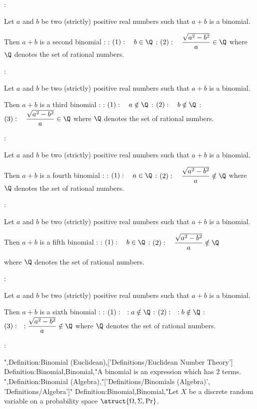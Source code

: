 :

Let $a$ and $b$ be two (strictly) positive real numbers such that $a + b$ is a binomial.


Then $a + b$ is a second binomial :
: $(1): \quad b \in \Q$
: $(2): \quad \dfrac {\sqrt {a^2 - b^2}} a \in \Q$
where $\Q$ denotes the set of rational numbers.



:

Let $a$ and $b$ be two (strictly) positive real numbers such that $a + b$ is a binomial.


Then $a + b$ is a third binomial :
: $(1): \quad a \notin \Q$
: $(2): \quad b \notin \Q$
: $(3): \quad \dfrac {\sqrt {a^2 - b^2}} a \in \Q$
where $\Q$ denotes the set of rational numbers.



:

Let $a$ and $b$ be two (strictly) positive real numbers such that $a + b$ is a binomial.


Then $a + b$ is a fourth binomial :
: $(1): \quad a \in \Q$
: $(2): \quad \dfrac {\sqrt {a^2 - b^2}} a \notin \Q$
where $\Q$ denotes the set of rational numbers.



:

Let $a$ and $b$ be two (strictly) positive real numbers such that $a + b$ is a binomial.


Then $a + b$ is a fifth binomial :
: $(1): \quad b \in \Q$
: $(2): \quad \dfrac {\sqrt {a^2 - b^2}} a \notin \Q$

where $\Q$ denotes the set of rational numbers.



:

Let $a$ and $b$ be two (strictly) positive real numbers such that $a + b$ is a binomial.


Then $a + b$ is a sixth binomial :
: $(1): \quad: a \notin \Q$
: $(2): \quad: b \notin \Q$
: $(3): \quad: \dfrac {\sqrt {a^2 - b^2}} a \notin \Q$
where $\Q$ denotes the set of rational numbers.



:

",Definition:Binomial (Euclidean),['Definitions/Euclidean Number Theory']
Definition:Binomial,Binomial,"A binomial is an expression which has $2$ terms.
",Definition:Binomial (Algebra),"['Definitions/Binomials (Algebra)', 'Definitions/Algebra']"
Definition:Binomial,Binomial,"Let $X$ be a discrete random variable on a probability space $\struct {\Omega, \Sigma, \Pr}$.


